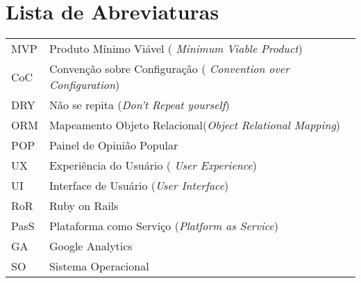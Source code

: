 \documentclass[12pt,twoside,a4paper]{book}
\begin{document}
\chapter{Lista de Abreviaturas}
\begin{tabular}{ll}
            MVP         &  Produto Mínimo Viável (\emph{ Minimum Viable Product})\\
            CoC         &  Convenção sobre Configuração (\emph{ Convention over Configuration}) \\
            DRY         &  Não se repita (\emph{Don't Repeat yourself})\\
            ORM         &  Mapeamento Objeto Relacional(\emph{Object Relational Mapping})\\
            POP         &  Painel de Opinião Popular\\
            UX          &  Experiência do Usuário ( \emph{User Experience})\\
            UI          &  Interface de Usuário (\emph{User Interface})\\
            RoR         &  Ruby on Rails\\
            PasS        &  Plataforma como Serviço (\emph{Platform as Service})\\
            GA          & Google Analytics \\
            SO          & Sistema Operacional \\
\end{tabular}

\end{document}
